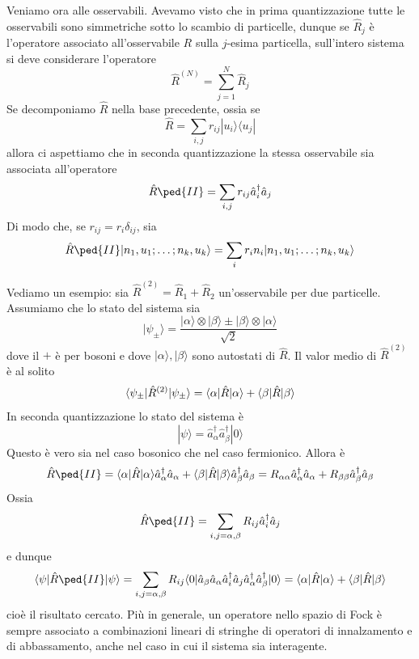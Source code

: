 \documentclass[a4paper, 11pt]{article}
\newcommand{\op}[1]{\hat{#1}}
\renewcommand{\op}[1]{\hat{#1}}
\renewcommand{\ket}[1]{| #1\rangle}
\renewcommand{\bra}[1]{\langle #1|}
\begin{document}
Veniamo ora alle osservabili. Avevamo visto che in prima quantizzazione tutte le osservabili sono simmetriche sotto lo scambio di particelle, dunque se $\op R_j$ è l'operatore associato all'osservabile $R$ sulla $j$-esima particella, sull'intero sistema si deve considerare l'operatore
\[\op R^{(N)}=\sum_{j=1}^{N}\op R_j\]
Se decomponiamo $\op R$ nella base precedente, ossia se
\[\op R=\sum_{i,j}r_{ij}\ket{u_i}\bra{u_j}\]
allora ci aspettiamo che in seconda quantizzazione la stessa osservabile sia associata all'operatore
\[\op R\ped{II}=\sum_{i,j}r_{ij}\op a_i^\dagger\op a_j\]
Di modo che, se $r_{ij}=r_i\delta_{ij}$, sia
\[\op R\ped{II}\ket{n_1,u_1;\ldots;n_k,u_k}=\sum_ir_in_i\ket{n_1,u_1;\ldots;n_k,u_k}\]

Vediamo un esempio: sia $\op R^{(2)}=\op R_1+\op R_2$ un'osservabile per due particelle. Assumiamo che lo stato del sistema sia
\[\ket{\psi_\pm}=\frac{\ket{\alpha}\otimes\ket{\beta}\pm\ket{\beta}\otimes\ket \alpha}{\sqrt{2}}\]
dove il $+$ è per bosoni e dove $\ket \alpha,\ket \beta$ sono autostati di $\op R$. Il valor medio di $\op R^{(2)}$ è al solito
\[\braketop{\psi_\pm}{\op R^{(2)}}{\psi_\pm}=\braketop{\alpha}{\op R}{\alpha}+\braketop{\beta}{\op R}{\beta}\] In seconda quantizzazione lo stato del sistema è
\[\ket{\psi}=\op a_\alpha^\dagger\op a_\beta^\dagger\ket{0}\]
Questo è vero sia nel caso bosonico che nel caso fermionico. Allora è
\[\op R\ped{II}=\braketop{\alpha}{\op R}{\alpha}\op a_\alpha^\dagger\op a_\alpha+\braketop{\beta}{\op R}{\beta}\op a_\beta^\dagger\op a_\beta= R_{\alpha\alpha}\op a_\alpha^\dagger\op a_\alpha+R_{\beta\beta}\op a_\beta^\dagger\op a_\beta\]
Ossia
\[\op R\ped{II}=\sum_{i,j=\alpha,\beta}R_{ij}\op a_i^\dagger\op a_j\]
e dunque
\[\braketop{\psi}{\op R\ped{II}}{\psi}=\sum_{i,j=\alpha,\beta}R_{ij}\braketop{0}{\op a_\beta\op a_\alpha\op a_i^\dagger\op a_j\op a_\alpha^\dagger\op a_\beta^\dagger}{0}=\braketop{\alpha}{\op R}{\alpha}+\braketop{\beta}{\op R}{\beta}\]
cioè il risultato cercato. Più in generale, un operatore nello spazio di Fock è sempre associato a combinazioni lineari di stringhe di operatori di innalzamento e di abbassamento, anche nel caso in cui il sistema sia interagente.
\end{document}
